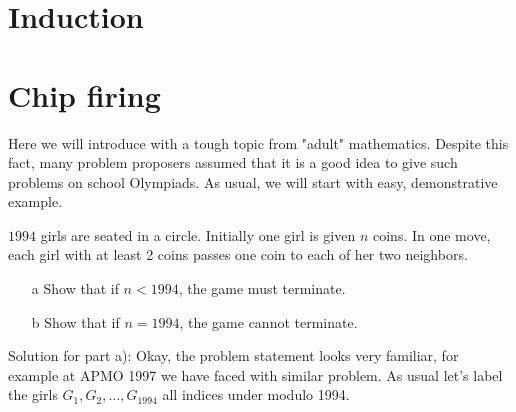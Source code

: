 \begin{example}

\end{example}

\section{Induction}

\begin{example}

\end{example}



\section{Chip firing}

Here we will introduce with a tough topic from "adult" mathematics. Despite this fact, many problem proposers assumed that it is a good idea to give such problems on school Olympiads. As usual, we will start with easy, demonstrative example. 

\begin{example}[ISL 1994]
    $1994$ girls are seated in a circle. Initially one girl is given $n$ coins. In one move, each girl with at least 2 coins passes one coin to each of her two neighbors. 

    \begin{itemize}
        \item[a] Show that if $n<1994$, the game must terminate.
        \item[b] Show that if $n=1994$, the game cannot terminate.
    \end{itemize}
\end{example}

\sol 
Solution for part a): Okay, the problem statement looks very familiar, for example at APMO 1997 we have faced with similar problem. As usual let's label the girls $G_1, G_2, \dots, G_{1994}$ all indices under modulo 1994.

